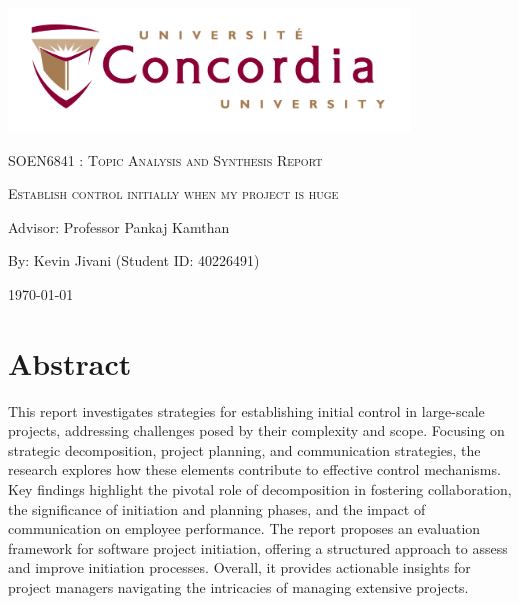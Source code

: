 \documentclass[runningheads]{llncs}
\begin{document}
\begin{titlepage}
    \centering
    \includegraphics[width=0.8\textwidth]{image.jpeg}\par %
     \vspace{2cm}
    {\scshape\large SOEN6841 : Topic Analysis and Synthesis Report \par}
    \vspace{1.5cm}
    {\scshape\Huge Establish control initially when my project is huge\par}
    \vspace{1.5cm}
    \vspace{1.5cm}
    {\large Advisor: Professor Pankaj Kamthan\par}
    \vspace{1.5cm}
    {\large By: Kevin Jivani (Student ID: 40226491)\par}
    \vspace{1cm}
    {\large \today\par}
\end{titlepage}

\setcounter{tocdepth}{3}
\setcounter{secnumdepth}{3}
\tableofcontents
\newpage


\section*{Abstract}
This report investigates strategies for establishing initial control in large-scale projects, addressing challenges posed by their complexity and scope. Focusing on strategic decomposition, project planning, and communication strategies, the research explores how these elements contribute to effective control mechanisms. Key findings highlight the pivotal role of decomposition in fostering collaboration, the significance of initiation and planning phases, and the impact of communication on employee performance. The report proposes an evaluation framework for software project initiation, offering a structured approach to assess and improve initiation processes. Overall, it provides actionable insights for project managers navigating the intricacies of managing extensive projects.
\newpage
\end{document}
